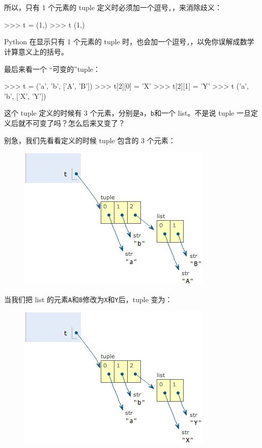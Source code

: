 所以，只有 1 个元素的 tuple 定义时必须加一个逗号\texttt{,}，来消除歧义：

\begin{pythoncode}
>>> t = (1,)
>>> t
(1,)
\end{pythoncode}

Python 在显示只有 1 个元素的 tuple
时，也会加一个逗号\texttt{,}，以免你误解成数学计算意义上的括号。

最后来看一个 ``可变的''tuple：

\begin{pythoncode}
>>> t = ('a', 'b', ['A', 'B'])
>>> t[2][0] = 'X'
>>> t[2][1] = 'Y'
>>> t
('a', 'b', ['X', 'Y'])
\end{pythoncode}

这个 tuple 定义的时候有 3
个元素，分别是\texttt{\textquotesingle{}a\textquotesingle{}}，\texttt{\textquotesingle{}b\textquotesingle{}}和一个
list。不是说 tuple 一旦定义后就不可变了吗？怎么后来又变了？

别急，我们先看看定义的时候 tuple 包含的 3 个元素：

 
 \begin{figure}[htp]
	\centering
	\includegraphics[width=0.6\linewidth]{fig/9239735167876800.png}
\end{figure}


当我们把 list
的元素\texttt{\textquotesingle{}A\textquotesingle{}}和\texttt{\textquotesingle{}B\textquotesingle{}}修改为\texttt{\textquotesingle{}X\textquotesingle{}}和\texttt{\textquotesingle{}Y\textquotesingle{}}后，tuple
变为：

 
 \begin{figure}[htp]
	\centering
	\includegraphics[width=0.6\linewidth]{fig/9239736475158720.png}
\end{figure}


